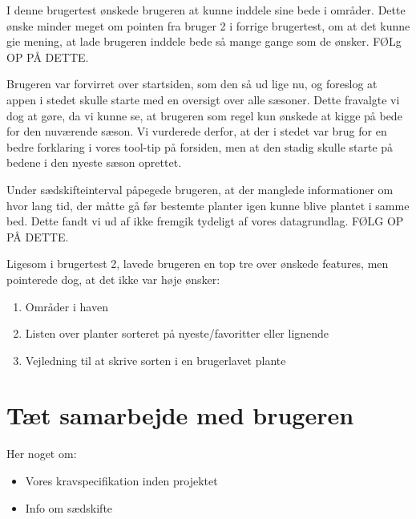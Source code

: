 I denne brugertest ønskede brugeren at kunne inddele sine bede i områder. Dette ønske minder meget om pointen fra bruger 2 i forrige brugertest, om at det kunne gie mening, at lade brugeren inddele bede så mange gange som de ønsker. FØLg OP PÅ DETTE.

Brugeren var forvirret over startsiden, som den så ud lige nu, og foreslog at appen i stedet skulle starte med en oversigt over alle sæsoner. Dette fravalgte vi dog at gøre, da vi kunne se, at brugeren som regel kun ønskede at kigge på bede for den nuværende sæson. Vi vurderede derfor, at der i stedet var brug for en bedre forklaring i vores tool-tip på forsiden, men at den stadig skulle starte på bedene i den nyeste sæson oprettet.

Under sædskifteinterval påpegede brugeren, at der manglede informationer om hvor lang tid, der måtte gå før bestemte planter igen kunne blive plantet i samme bed. Dette fandt vi ud af ikke fremgik tydeligt af vores datagrundlag. FØLG OP PÅ DETTE.

Ligesom i brugertest 2, lavede brugeren en top tre over ønskede features, men pointerede dog, at det ikke var høje ønsker:

\begin{enumerate}
        \item Områder i haven
        \item Listen over planter sorteret på nyeste/favoritter eller lignende
        \item Vejledning til at skrive sorten i en brugerlavet plante 
\end{enumerate}

\section{Tæt samarbejde med brugeren}
Her noget om:
\begin{itemize}
    \item Vores kravspecifikation inden projektet
    \item Info om sædskifte
\end{itemize} 

